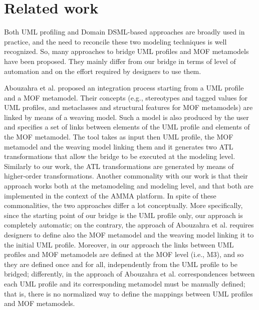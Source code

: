 \section{Related work}\label{sec:related}

Both UML profiling and Domain DSML-based approaches are broadly used in practice, and the need to reconcile these two
modeling techniques is well recognized. 
So, many approaches to bridge UML profiles and MOF metamodels have been proposed. 
They mainly differ from our bridge in terms of level of automation and on the effort required by designers to use them.

Abouzahra et al. \cite{Abouzahra} proposed an integration process starting from a UML profile and a MOF metamodel.
Their concepts (e.g., stereotypes and tagged values for UML profiles, and metaclasses and structural features for MOF metamodels) 
are linked by means of a weaving model. Such a model is also produced by the user and specifies a set of links between elements
of the UML profile and elements of the MOF metamodel.
The tool takes as input then UML profile, the MOF metamodel and the weaving model linking them and it generates two ATL transformations that allow
the bridge to be executed at the modeling level. Similarly to our work, the ATL transformations are generated by means of 
higher-order transformations. Another commonality with our work is that their approach works both at the metamodeling and modeling level,
and that both are implemented in the context of the AMMA platform.
In spite of these commonalities, the two approaches differ a lot conceptually. More specifically,
since the starting point of our bridge is the UML profile only, our approach is completely automatic;
on the contrary,  the approach of Abouzahra et al. requires designers to define
also the MOF metamodel and the weaving model linking it to the initial UML profile.
Moreover, in our approach the links between UML profiles and MOF metamodels are defined at the MOF level (i.e., M3), and so
they are defined once and for all, independently from the UML profile to be bridged; differently, 
in the approach of Abouzahra et al. correspondences between each UML profile and its corresponding metamodel must be manually defined; 
that is, there is no normalized way to define the mappings between UML profiles and MOF metamodels.

